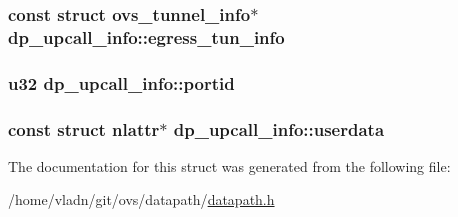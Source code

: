 \subsubsection[{egress\+\_\+tun\+\_\+info}]{\setlength{\rightskip}{0pt plus 5cm}const struct {\bf ovs\+\_\+tunnel\+\_\+info}$\ast$ dp\+\_\+upcall\+\_\+info\+::egress\+\_\+tun\+\_\+info}\label{structdp__upcall__info_a74a70c7b1f24487fd51d0f0c5aa1c11e}
\hypertarget{structdp__upcall__info_a4300576f43ab3d9293453d9c664de818}{}
\subsubsection[{portid}]{\setlength{\rightskip}{0pt plus 5cm}u32 dp\+\_\+upcall\+\_\+info\+::portid}\label{structdp__upcall__info_a4300576f43ab3d9293453d9c664de818}
\hypertarget{structdp__upcall__info_a78d8f8bd4a0418b043a3a2401e516d5a}{}
\subsubsection[{userdata}]{\setlength{\rightskip}{0pt plus 5cm}const struct nlattr$\ast$ dp\+\_\+upcall\+\_\+info\+::userdata}\label{structdp__upcall__info_a78d8f8bd4a0418b043a3a2401e516d5a}


The documentation for this struct was generated from the following file\+:\begin{DoxyCompactItemize}
\item 
/home/vladn/git/ovs/datapath/\hyperlink{datapath_8h}{datapath.\+h}\end{DoxyCompactItemize}
